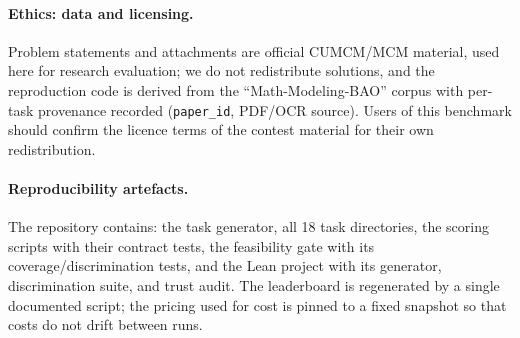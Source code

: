\paragraph{Ethics: data and licensing.} Problem statements and attachments are official CUMCM/MCM material, used here for research evaluation; we do not redistribute solutions, and the reproduction code is derived from the ``Math-Modeling-BAO'' corpus with per-task provenance recorded (\texttt{paper\_id}, PDF/OCR source). Users of this benchmark should confirm the licence terms of the contest material for their own redistribution.

\paragraph{Reproducibility artefacts.} The repository contains: the task generator, all 18 task directories, the scoring scripts with their contract tests, the feasibility gate with its coverage/discrimination tests, and the Lean project with its generator, discrimination suite, and trust audit. The leaderboard is regenerated by a single documented script; the pricing used for cost is pinned to a fixed snapshot so that costs do not drift between runs.
